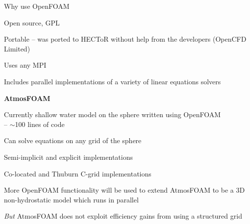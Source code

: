 \begin{slide}{Why use OpenFOAM}

\begin{list0}

\item Open source, GPL

\item Portable -- was ported to HECToR without help from the developers (OpenCFD Limited)

\item Uses any MPI

\item Includes parallel implementations of a variety of linear equations solvers

\end{list0}

{\centering\bf\Large
AtmosFOAM
}

\begin{list0}

\item Currently shallow water model on the sphere written using OpenFOAM \\
-- $\sim$100 lines of code

\item Can solve equations on any grid of the sphere

\item Semi-implicit and explicit implementations

\item Co-located and Thuburn C-grid implementations

\item More OpenFOAM functionality will be used to extend AtmosFOAM to be a 3D non-hydrostatic model which runs in parallel

\item {\color{purple}\it But} AtmosFOAM does not exploit efficiency gains from using a structured grid

\end{list0}

\end{slide}
